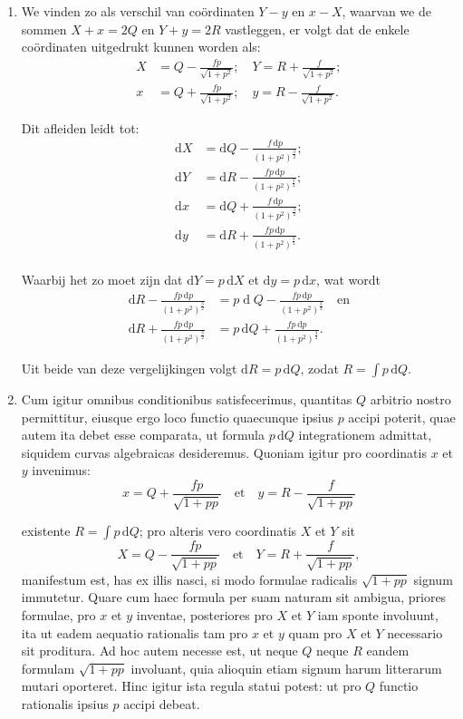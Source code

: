 \documentclass[10pt,a4paper]{article}
\newcommand{\switchenum}{\setcounter{enumi}{\arabic{enumi}-1}\switchcolumn}
\def\D{\mathrm{d}}
\begin{document}
\begin{paracol}{2}
\begin{enumerate}[topsep=1px]
		\switchenum
		\item We vinden zo als verschil van coördinaten $Y-y$ en $x-X$, waarvan we de sommen $X+x=2Q$ en $Y+y=2R$ vastleggen, er volgt dat de enkele coördinaten uitgedrukt kunnen worden als:
		\begin{align*}
			X &= Q - \frac{fp}{\sqrt{1+p^2}}; \quad Y = R + \frac{f}{\sqrt{1+p^2}};\\
			x &= Q+\frac{fp}{\sqrt{1+p^2}}; \quad y= R- \frac{f}{\sqrt{1+p^2}}.
		\end{align*}
		\par Dit afleiden leidt tot:
		\begin{align*}
			\D X &= \D Q - \frac{f\,\D p}{(1+p^2)^\frac{3}{2}};\\
			\D Y &= \D R-\frac{fp\,\D p}{(1+p^2)^\frac{3}{2}};\\
			\D x &= \D Q + \frac{f\,\D p}{(1+p^2)^\frac{3}{2}};\\
			\D y &= \D R + \frac{fp\,\D p}{(1+p^2)^\frac{3}{2}}.\\
		\end{align*}
		\par Waarbij het zo moet zijn dat $\D Y=p\,\D X$ et $\D y=p\,\D x$, wat wordt
		\begin{align*}
			\D R - \frac{fp\,\D p}{(1+p^2)^\frac{3}{2}} &= p\operatorname{d}Q - \frac{fp\, \D p}{(1+p^2)^\frac{3}{2}} \quad \text{en}\\
			\D R + \frac{fp\,\D p}{(1+p^2)^\frac{3}{2}} &= p\,\D Q + \frac{fp\,\D p}{(1+p^2)^\frac{3}{2}}.
		\end{align*}
		\par Uit beide van deze vergelijkingen volgt $\D R = p \, \D Q$, zodat $R= \int p \,\D Q$.
		\switchcolumn*
		
		\item Cum igitur omnibus conditionibus satisfecerimus, quantitas $Q$ arbitrio nostro permittitur, eiusque ergo loco functio quaecunque ipsius $p$ accipi poterit, quae autem ita debet esse comparata, ut formula $p\,\D Q$ integrationem admittat, siquidem curvas algebraicas desideremus. Quoniam igitur pro coordinatis $x$ et $y$ invenimus:
		\[
			x = Q + \frac{fp}{\sqrt{1+pp}} \quad\text{et}\quad y = R - \frac{f}{\sqrt{1+pp}}
		\]
		\par existente $R = \int p \,\D Q$; pro alteris vero coordinatis $X$ et $Y$ sit
		\[
			X = Q- \frac{fp}{\sqrt{1+pp}} \quad \text{et} \quad Y = R + \frac{f}{\sqrt{1+pp}},
		\]
		manifestum est, has ex illis nasci, si modo formulae radicalis $\sqrt{1+pp}$ signum immutetur. Quare cum haec formula per suam naturam sit ambigua, priores formulae, pro $x$ et $y$ inventae, posteriores pro $X$ et $Y$ iam sponte involuunt, ita ut eadem aequatio rationalis tam pro $x$ et $y$ quam pro $X$ et $Y$ necessario sit proditura. Ad hoc autem necesse est, ut neque $Q$ neque $R$ eandem formulam $\sqrt{1+pp}$ involuant, quia alioquin etiam signum harum litterarum mutari oporteret. Hinc igitur ista regula statui potest: ut pro $Q$ functio rationalis ipsius $p$ accipi debeat.
		

\end{enumerate}
\end{paracol}
\end{document}

